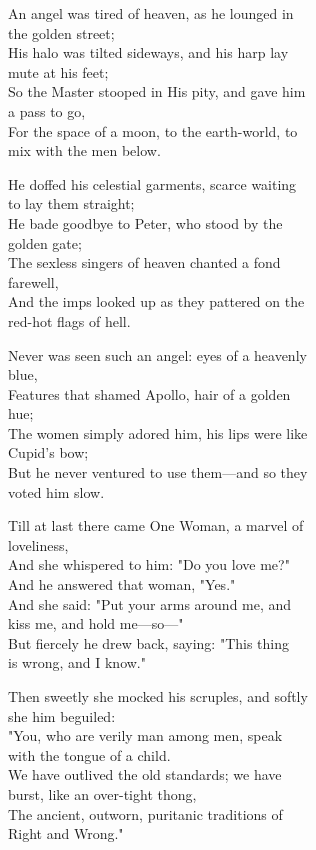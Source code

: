 

\begin{poemblock}
An angel was tired of heaven, as he lounged in\\
\idt the golden street;\\
His halo was tilted sideways, and his harp lay\\
\idt mute at his feet;\\
So the Master stooped in His pity, and gave him\\
\idt a pass to go,\\
For the space of a moon, to the earth-world, to\\
\idt mix with the men below.

He doffed his celestial garments, scarce waiting\\
\idt to lay them straight;\\
He bade goodbye to Peter, who stood by the\\
\idt golden gate;\\
The sexless singers of heaven chanted a fond\\
\idt farewell,\\
And the imps looked up as they pattered on the\\
\idt red-hot flags of hell.

Never was seen such an angel: eyes of a heavenly\\
\idt blue,\\
Features that shamed Apollo, hair of a golden\\
\idt hue;\\
The women simply adored him, his lips were like\\
\idt Cupid's bow;\\
But he never ventured to use them—and so they\\
\idt voted him slow.

Till at last there came One Woman, a marvel of\\
\idt loveliness,\\
And she whispered to him: "Do you love me?"\\
\idt And he answered that woman, "Yes."\\
And she said: "Put your arms around me, and\\
\idt kiss me, and hold me—so—"\\
But fiercely he drew back, saying: "This thing\\
\idt is wrong, and I know."

Then sweetly she mocked his scruples, and softly\\
\idt she him beguiled:\\
"You, who are verily man among men, speak\\
\idt with the tongue of a child.\\
We have outlived the old standards; we have\\
\idt burst, like an over-tight thong,\\
The ancient, outworn, puritanic traditions of\\
\idt Right and Wrong."


\end{poemblock}
